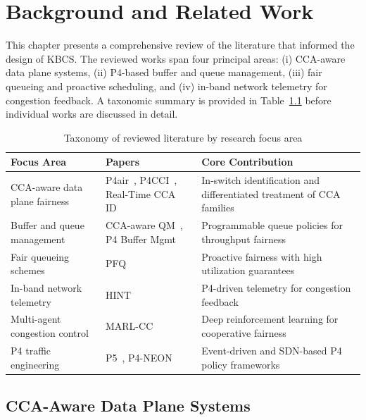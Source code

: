 \documentclass[12pt,a4paper]{report}
\begin{document}
\chapter{Background and Related Work}

This chapter presents a comprehensive review of the literature that informed the design of KBCS. The reviewed works span four principal areas: (i) CCA-aware data plane systems, (ii) P4-based buffer and queue management, (iii) fair queueing and proactive scheduling, and (iv) in-band network telemetry for congestion feedback. A taxonomic summary is provided in Table~\ref{tab:literature_taxonomy} before individual works are discussed in detail.

\begin{table}[H]
\centering
\caption{Taxonomy of reviewed literature by research focus area}
\label{tab:literature_taxonomy}
\renewcommand{\arraystretch}{1.3}
\begin{tabularx}{\textwidth}{@{}p{3.8cm}p{3.2cm}X@{}}
\toprule
\textbf{Focus Area} & \textbf{Papers} & \textbf{Core Contribution} \\
\midrule
CCA-aware data plane fairness & P4air~\cite{p4air}, P4CCI~\cite{p4cci}, Real-Time CCA ID~\cite{realtimecca} & In-switch identification and differentiated treatment of CCA families \\
Buffer and queue management & CCA-aware QM~\cite{ccaaware}, P4 Buffer Mgmt~\cite{buffermgmt} & Programmable queue policies for throughput fairness \\
Fair queueing schemes & PFQ~\cite{pfq} & Proactive fairness with high utilization guarantees \\
In-band network telemetry & HINT~\cite{hint} & P4-driven telemetry for congestion feedback \\
Multi-agent congestion control & MARL-CC~\cite{marlcc} & Deep reinforcement learning for cooperative fairness \\
P4 traffic engineering & P5~\cite{p5}, P4-NEON~\cite{p4neon} & Event-driven and SDN-based P4 policy frameworks \\
\bottomrule
\end{tabularx}
\end{table}

\section{CCA-Aware Data Plane Systems}
\end{document}
